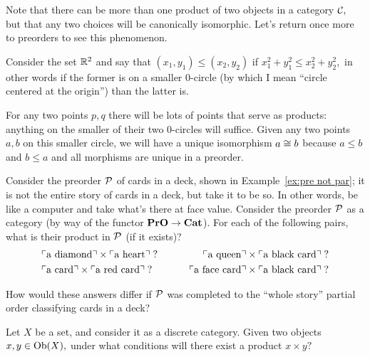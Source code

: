 \documentclass[CT4S-EN-RU]{subfiles}
\begin{document}
\begin{exampleENG}
Note that there can be more than one product of two objects in a category $\mathcal{C},$ but that any two choices will be canonically isomorphic. Let's return once more to preorders to see this phenomenon.

Consider the set ${\mathbb R}^2$ and say that $(x_1,y_1)\leq (x_2,y_2)$ if $x_1^2+y_1^2\leq x_2^2+y_2^2,$ in other words if the former is on a smaller 0-circle (by which I mean “circle centered at the origin”) than the latter is. 

For any two points $p,q$ there will be lots of points that serve as products: anything on the smaller of their two 0-circles will suffice. Given any two points $a,b$ on this smaller circle, we will have a unique isomorphism $a\cong b$ because $a\leq b$ and $b\leq a$ and all morphisms are unique in a preorder.
\end{exampleENG}

\begin{exampleRUS}
\end{exampleRUS}

\begin{exerciseENG}
Consider the preorder $\mathcal{P}$ of cards in a deck, shown in Example~\ref{ex:pre not par}; it is not the entire story of cards in a deck, but take it to be so. In other words, be like a computer and take what's there at face value. Consider the preorder $\mathcal{P}$ as a category (by way of the functor ${\mathbf{PrO}}\rightarrow{\mathbf{Cat}}$).
\sexc For each of the following pairs, what is their product in $\mathcal{P}$ (if it exists)?
\begin{align*}
&\textnormal{$\ulcorner$a diamond$\urcorner$}\times\textnormal{$\ulcorner$a heart$\urcorner$}\;? \hspace{.3in} &\textnormal{$\ulcorner$a queen$\urcorner$}\times\textnormal{$\ulcorner$a black card$\urcorner$}\;?\\
& \textnormal{$\ulcorner$a card$\urcorner$}\times\textnormal{$\ulcorner$a red card$\urcorner$}\;?\hspace{.3in}&\textnormal{$\ulcorner$a face card$\urcorner$}\times\textnormal{$\ulcorner$a black card$\urcorner$}\;?
\end{align*}
\item How would these answers differ if $\mathcal{P}$ was completed to the “whole story” partial order classifying cards in a deck?
\endsexc
\end{exerciseENG}

\begin{exerciseRUS}
\end{exerciseRUS}

\begin{exerciseENG}
Let $X$ be a set, and consider it as a discrete category. Given two objects $x,y\in\textnormal{Ob}(X),$ under what conditions will there exist a product $x\times y?$
\end{exerciseENG}
\end{document}
